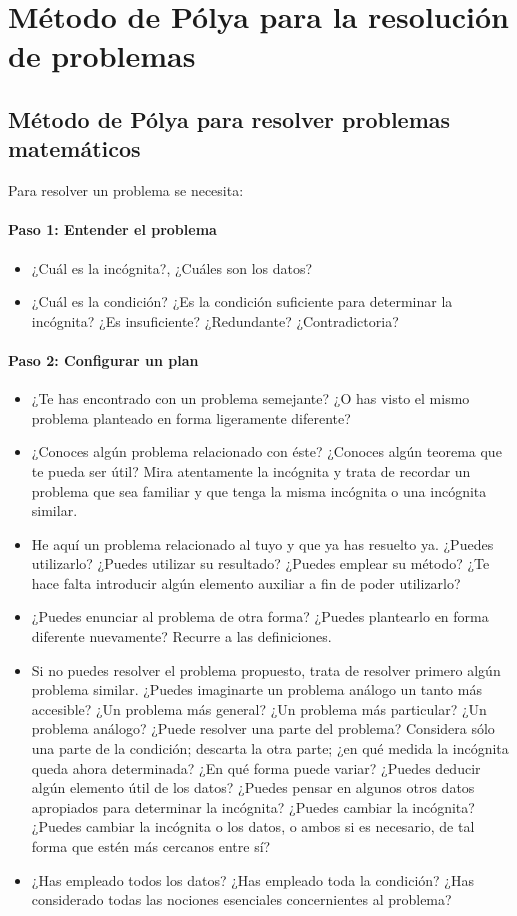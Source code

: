 \chapter{Método de Pólya para la resolución de problemas}

\section{Método de Pólya para resolver problemas matemáticos}

\noindent Para resolver un problema se necesita:
\subsubsection*{Paso 1: Entender el problema}
\begin{itemize}
\item ¿Cuál es la incógnita?, ¿Cuáles son los datos?
\item ¿Cuál es la condición? ¿Es la condición suficiente para determinar la
  incógnita? ¿Es insuficiente? ¿Redundante? ¿Contradictoria?
\end{itemize}

\subsubsection*{Paso 2: Configurar un plan}
\begin{itemize}
\item ¿Te has encontrado con un problema semejante? ¿O has visto el mismo
  problema planteado en forma ligeramente diferente?
\item ¿Conoces algún problema relacionado con éste? ¿Conoces algún teorema que
  te pueda ser útil? Mira atentamente la incógnita y trata de recordar un
  problema que sea familiar y que tenga la misma incógnita o una incógnita
  similar.
\item He aquí un problema relacionado al tuyo y que ya has resuelto ya. ¿Puedes
  utilizarlo? ¿Puedes utilizar su resultado? ¿Puedes emplear su método? ¿Te
  hace falta introducir algún elemento auxiliar a fin de poder utilizarlo?
\item ¿Puedes enunciar al problema de otra forma? ¿Puedes plantearlo en forma
  diferente nuevamente? Recurre a las definiciones.
\item Si no puedes resolver el problema propuesto, trata de resolver primero
  algún problema similar. ¿Puedes imaginarte un problema análogo un tanto más
  accesible? ¿Un problema más general? ¿Un problema más particular? ¿Un problema
  análogo? ¿Puede resolver una parte del problema? Considera sólo una parte de
  la condición; descarta la otra parte; ¿en qué medida la incógnita queda ahora
  determinada? ¿En qué forma puede variar? ¿Puedes deducir algún
  elemento útil de los datos? ¿Puedes pensar en algunos otros datos apropiados
  para determinar la incógnita? ¿Puedes cambiar la incógnita? ¿Puedes cambiar la
  incógnita o los datos, o ambos si es necesario, de tal forma que estén más
  cercanos entre sí?
\item ¿Has empleado todos los datos? ¿Has empleado toda la condición? ¿Has
  considerado todas las nociones esenciales concernientes al problema?
\end{itemize}

